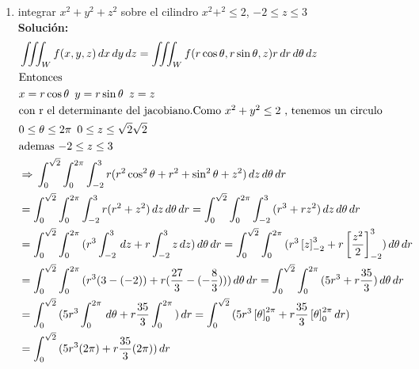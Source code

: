 \documentclass[10pt,letterpaper,fleqn]{article}
\begin{document}
\begin{enumerate}
        \item integrar $x^2+y^2+z^2$  sobre el cilindro $x^2+^2 \leq 2 $, $ -2\leq z \leq 3$
    	\\ \textbf{Solución:}
            	\begin{equation*}
                \begin{split}
                        & 
                        \iiint_W{f(x,y,z) \,d x \,d y \,d z}
                        = \iiint_W{f(r \cos{ \theta} , r \sin{\theta},z)r \, d r \,d\theta \,dz}
                        \\& \mbox{Entonces}
                        \\& x= r \cos{\theta} \,\,\, y = r \sin{\theta} \,\,\, z =z
                        \\& \mbox{con r el determinante del jacobiano.}
                        \mbox{Como $x^2+y^2 \leq 2$ , tenemos un circulo  }
                        \\&  0 \leq \theta \leq 2\pi \,\,\, 0 \leq z \leq \sqrt{2} \sqrt{2}
                        \\& \mbox{ademas $ -2\leq z \leq 3$ }
                        \\& \Rightarrow\,\int_0^{\sqrt{2}}{\int_0^{2\pi}{ \int_{-2}^{3}{ r(r^2 \cos^2 \theta + r^2 + \sin ^2 \theta +z^2)}} }\,dz\,d\theta\,dr
                        \\& = \int_0^{\sqrt{2}}{\int_0^{2\pi}{ \int_{-2}^{3}{ r( r^2 + z^2 )}} }\,dz\,d\theta\,d r
                        = \int_0^{\sqrt{2}}{\int_0^{2\pi}{ \int_{-2}^{3}{ (r^3 + r z^2 )}} }\,dz\,d\theta\,d r
                        \\&= \int_0^{\sqrt{2}}{\int_0^{2\pi}{ (r^3\int_{-2}^{3} \, dz +r\int_{-2}^{3}{z} \,dz)} }\,d\theta\, d r
                        = \int_0^{\sqrt{2}}{\int_0^{2\pi}{( r^3 \left[z\right]_{-2}^3 + r \left[\frac{z^2}{2}\right]_{-2}^3} )}\,d\theta\,d r
                        \\& = \int_0^{\sqrt{2}} {\int_0^{2\pi}{ (r^3 (3-(-2))+ r (\frac{27}{3} - (-\frac{8}{3}) ) } )}\,d\theta\,d r
                        = \int_0^{\sqrt{2}}{\int_0^{2\pi}{ (5 r^3 +r\frac{35}{3}}) }\,d\theta\,d r
                        \\&= \int_0^{\sqrt{2}}{( 5r^3 \int_0^{2\pi}{  } \,d\theta + r \frac{35}{3} \int_0^{2\pi}{ } )}\,d r
                        = \int_0^{\sqrt{2}}{ ( 5r^3 \left[\theta\right]_{0}^{2\pi} + r \frac{35}{3} \left[\theta\right]_{0}^{2\pi}}\,d r)
                        \\&= \int_0^{\sqrt{2}}{ (5r^3 (2\pi)  + r \frac{35}{3} (2\pi))}\,d r

\end{split}
\end{equation*}
\end{enumerate}
\end{document}
